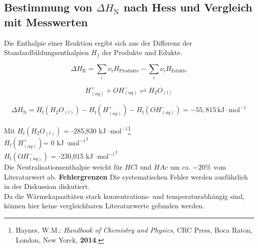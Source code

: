 \documentclass[12pt,a4paper,titlepage,headinclude,bibtotoc]{scrartcl}
\begin{document}
\subsection{Bestimmung von $\Delta H_\mathrm{N}$ nach Hess und Vergleich mit Messwerten}

Die Enthalpie einer Reaktion ergibt sich aus der Differenz der Standardbildungsenthalpien $H_f$ der Produkte und Edukte.

\begin{equation}
\Delta H_\mathrm{R}= \sum_i \nu_i H_\mathrm{Produkte}- \sum_i \nu_i H_\mathrm{Edukte}
\end{equation}

\begin{equation}
H^+_{(aq)} + OH^-_{(aq)} \rightleftharpoons H_2O_{(l)}
\end{equation}

\begin{equation}
\Delta H_\mathrm{N}= H_\mathrm{f}(H_2O_{(l)}) -H_\mathrm{f}(H^+_{(aq)}) -H_\mathrm{f}(OH^-_{(aq)}) = -55,815\, \mathrm{kJ}\cdot \mathrm{mol}^{-1}
\end{equation}

Mit $H_\mathrm{f}(H_2O_{(l)})$ = -285,830 kJ $\cdot \mathrm{mol}^{-1}$\footnote{Haynes, W.M.: \emph{Handbook of Chemistry and Physics}, CRC Press, Boca Raton, London, New Yorck, \textbf{2014}.}\\
$H_\mathrm{f}(H^+_{(aq)})$= 0 kJ $\cdot {\mathrm{mol}^{-1}}^1$\\
$H_\mathrm{f}(OH^-_{(aq)})$ = -230,015 kJ $\cdot {\mathrm{mol}^{-1}}^1$\\

Die Neutralisationsenthalpie weicht für $HCl$ und $HAc$ um ca. $-20\%$ vom Literaturwert ab. 
\textbf{Fehlergrenzen}
Die systematischen Fehler werden ausführlich in der Diskussion diskutiert.\\

Da die Wärmekapazitäten stark konzentrations- und temperaturabhängig sind, können hier keine vergleichbaren Literaturwerte gefunden werden.\\
\end{document}

